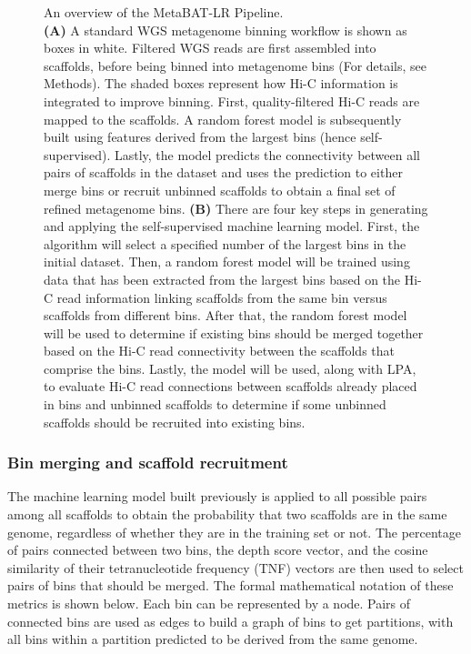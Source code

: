 \documentclass[fleqn,10pt,lineno]{wlpeerj}
\begin{document}
\begin{figure}
    \caption{An overview of the MetaBAT-LR Pipeline.\\ \textbf{(A)} A standard WGS metagenome binning workflow is shown as boxes in white. Filtered WGS reads are first assembled into scaffolds, before being binned into metagenome bins (For details, see Methods). The shaded boxes represent how Hi-C information is integrated to improve binning. First, quality-filtered Hi-C reads are mapped to the scaffolds. A random forest model is subsequently built using features derived from the largest bins (hence self-supervised). Lastly, the model predicts the connectivity between all pairs of scaffolds in the dataset and uses the prediction to either merge bins or recruit unbinned scaffolds to obtain a final set of refined metagenome bins. \textbf{(B)} There are four key steps in generating and applying the self-supervised machine learning model. First, the algorithm will select a specified number of the largest bins in the initial dataset. Then, a random forest model will be trained using data that has been extracted from the largest bins based on the Hi-C read information linking scaffolds from the same bin versus scaffolds from different bins. After that, the random forest model will be used to determine if existing bins should be merged together based on the Hi-C read connectivity between the scaffolds that comprise the bins. Lastly, the model will be used, along with LPA, to evaluate Hi-C read connections between scaffolds already placed in bins and unbinned scaffolds to determine if some unbinned scaffolds should be recruited into existing bins.}
    \label{fig:pipeline}
\end{figure}

\subsubsection*{Bin merging and scaffold recruitment}

The machine learning model built previously is applied to all possible pairs among all scaffolds to obtain the probability that two scaffolds are in the same genome, regardless of whether they are in the training set or not. The percentage of pairs connected between two bins, the depth score vector, and the cosine similarity of their tetranucleotide frequency (TNF) vectors are then used to select pairs of bins that should be merged. The formal mathematical notation of these metrics is shown below. Each bin can be represented by a node. Pairs of connected bins are used as edges to build a graph of bins to get partitions, with all bins within a partition predicted to be derived from the same genome.
\end{document}
